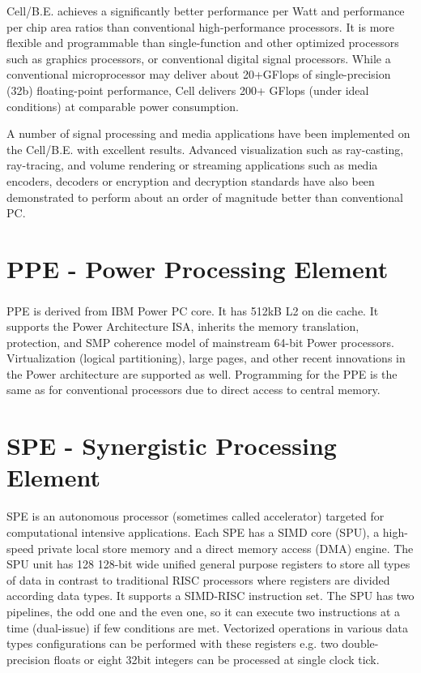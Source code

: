 \mbox{Cell/B.E.} achieves a significantly better performance per Watt and performance per chip area ratios than conventional high-performance processors.
It is more flexible and programmable than single-function and other optimized processors such as graphics processors, or conventional digital signal processors.
While a conventional microprocessor may deliver about 20+GFlops of single-precision (32b) floating-point performance, Cell delivers 200+ GFlops (under ideal conditions) at comparable power consumption.

A number of signal processing and media applications have been implemented on the \mbox{Cell/B.E.} with excellent results.
Advanced visualization such as ray-casting, ray-tracing, and volume rendering or streaming applications such as media encoders, decoders or encryption and decryption standards have also been demonstrated to perform about an order of magnitude better than conventional PC.


\section{PPE - Power Processing Element}

PPE is derived from IBM Power PC\textsuperscript{\textregistered} core. It has 512kB L2 on die cache.
It supports the Power Architecture ISA, inherits the memory translation, protection, and SMP coherence model of mainstream 64-bit Power processors.
Virtualization (logical partitioning), large pages, and other recent innovations in the Power architecture are supported as well.
Programming for the PPE is the same as for conventional processors due to direct access to central memory.

\section{SPE - Synergistic Processing Element}

\par
SPE is an autonomous processor (sometimes called accelerator) targeted for computational intensive applications.
Each SPE has a SIMD core (SPU), a high-speed private local store memory and a direct memory access (DMA) engine.
The SPU unit has 128 128-bit wide unified general purpose registers to store all types of data in contrast to traditional RISC processors where registers are divided according data types.
It supports a SIMD-RISC instruction set.
The SPU has two pipelines, the odd one and the even one, so it can execute two instructions at a time (dual-issue) if few conditions are met.
Vectorized operations in various data types configurations can be performed with these registers e.g. two double-precision floats or eight 32bit integers can be processed at single clock tick.

